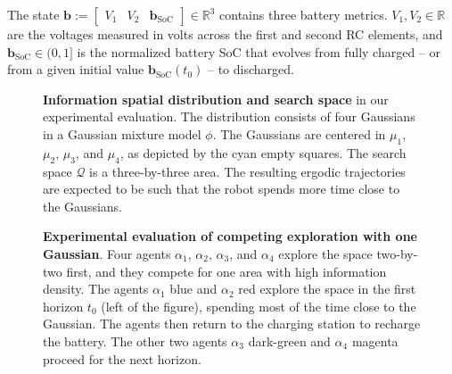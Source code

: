 \documentclass[letterpaper,10pt,conference,twoside]{IEEEtran}
\theoremstyle{definition}
\begin{document}
The state $\mathbf{b}:=\begin{bmatrix}V_1&V_2&\mathbf{b}_{\text{SoC}}\end{bmatrix}\in\mathbb{R}^3$ contains three battery metrics. $V_1,V_2\in\mathbb{R}$ are the voltages measured in volts across the first and second RC elements, and $\mathbf{b}_{\text{SoC}}\in(0,1]$ is the normalized battery SoC that evolves from fully charged -- or from a given initial value $\mathbf{b}_{\text{SoC}}(t_0)$ -- to discharged.



\begin{figure}[t!]
  \begin{minipage}[t!]{.5\columnwidth}
    \vspace*{-.2cm}
    
  \end{minipage}
  \begin{minipage}[c]{.48\columnwidth}
    \vspace*{.05cm}
    \caption{\textbf{Information spatial distribution and search space} in our experimental evaluation. The distribution consists of four Gaussians in a Gaussian mixture model $\phi$. The Gaussians are centered in $\mu_1$, $\mu_2$, $\mu_3$, and $\mu_4$, as depicted by the cyan empty squares. The search space $\mathcal{Q}$ is a three-by-three area. The resulting ergodic trajectories are expected to be such that the robot spends more time close to the Gaussians.}
    \label{fig:scenario}
  \end{minipage}
  \vspace*{-.15cm}
\end{figure}

\begin{figure}[b!]
  \vspace*{-.3cm}
  
  \caption{\textbf{Experimental evaluation of %
  competing exploration with one Gaussian}.
  Four agents $\alpha_1$, $\alpha_2$, $\alpha_3$, and $\alpha_4$ explore the space two-by-two first, and they compete for one area with high information density. The agents $\alpha_1$ blue and $\alpha_2$ red explore the space in the first horizon $t_0$ (left of the figure), spending most of the time close to the Gaussian. The agents then return to the charging station to recharge the battery. The other two agents $\alpha_3$ dark-green and $\alpha_4$ magenta proceed for the next horizon.}%
  \label{fig:res2}
\end{figure}
\end{document}
